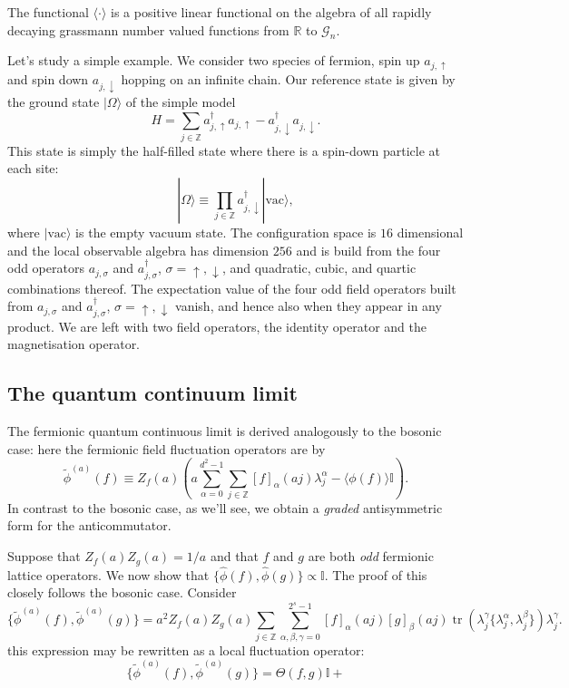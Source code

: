 \documentclass[prl,twocolumn,lengthcheck,superscriptaddress]{revtex4-1}
\newcommand{\tr}{\operatorname{tr}}
\theoremstyle{definition}
\theoremstyle{remark}
\begin{document}
The functional $\langle \cdot \rangle$ is a positive linear functional on the algebra of all rapidly decaying grassmann number valued functions from $\mathbb{R}$ to $\mathcal{G}_n$.

Let's study a simple example. We consider two species of fermion, spin up $a_{j,\uparrow}$ and spin down $a_{j,\downarrow}$ hopping on an infinite chain. Our reference state is given by the ground state $|\Omega\rangle$ of the simple model 
\begin{equation}
	H = \sum_{j\in\mathbb{Z}} a_{j,\uparrow}^\dag a_{j,\uparrow} - a_{j,\downarrow}^\dag a_{j,\downarrow}.
\end{equation}
This state is simply the half-filled state where there is a spin-down particle at each site:
\begin{equation}
	|\Omega\rangle \equiv \prod_{j\in\mathbb{Z}} a_{j,\downarrow}^\dag|\text{vac}\rangle,
\end{equation}
where $|\text{vac}\rangle$ is the empty vacuum state. The configuration space is $16$ dimensional and the local observable algebra has dimension $256$ and is build from the four odd operators $a_{j,\sigma}$ and $a_{j,\sigma}^\dag$, $\sigma = \uparrow, \downarrow$, and quadratic, cubic, and quartic combinations thereof.  The expectation value of the four odd field operators built from $a_{j,\sigma}$ and $a_{j,\sigma}^\dag$, $\sigma = \uparrow, \downarrow$ vanish, and hence also when they appear in any product. We are left with two field operators, the identity operator and the magnetisation operator.

\subsection{The quantum continuum limit}
The fermionic quantum continuous limit is derived analogously to the bosonic case: here the fermionic field fluctuation operators are by
\begin{equation}
	\widetilde{\phi}^{(a)}(f) \equiv Z_f(a)\left( a\sum_{\alpha=0}^{d^2-1}\sum_{j\in \mathbb{Z}} [f]_\alpha(aj) \lambda^\alpha_j - \langle\phi(f)\rangle\mathbb{I}\right).
\end{equation}
In contrast to the bosonic case, as we'll see, we obtain a \emph{graded} antisymmetric form for the anticommutator. 

Suppose that $Z_f(a)Z_g(a) = 1/a$ and that $f$ and $g$ are both \emph{odd} fermionic lattice operators. We now show that $\{\widehat{\phi}(f), \widehat{\phi}(g)\} \propto \mathbb{I}$. The proof of this closely follows the bosonic case.  Consider
\begin{equation}
		\{\widetilde{\phi}^{(a)}(f), \widetilde{\phi}^{(a)}(g)\} = a^2Z_f(a)Z_g(a)\sum_{j\in\mathbb{Z}} \sum_{\alpha,\beta,\gamma=0}^{2^s-1} [f]_\alpha(aj)[g]_\beta(aj) \tr(\lambda^{\gamma}_j\{\lambda_j^\alpha, \lambda_j^\beta\})  \lambda^\gamma_j.
\end{equation} 
this expression may be rewritten as a local fluctuation operator:
\begin{equation}
	\{\widetilde{\phi}^{(a)}(f), \widetilde{\phi}^{(a)}(g)\} = \Theta(f,g)\mathbb{I} + 
\end{equation}
\end{document}
